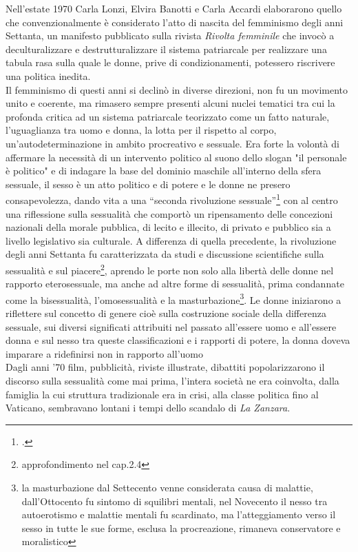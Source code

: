 Nell'estate 1970 Carla Lonzi, Elvira Banotti e Carla Accardi elaborarono quello che convenzionalmente è considerato l'atto di nascita del femminismo degli anni Settanta,  un manifesto pubblicato sulla rivista \textit{Rivolta femminile} che invocò a deculturalizzare e destrutturalizzare il sistema patriarcale per realizzare una tabula rasa sulla quale le donne, prive di condizionamenti, potessero riscrivere una politica inedita.
\\ Il femminismo di questi anni si declinò in diverse direzioni, non fu un movimento unito e coerente, ma rimasero sempre presenti alcuni nuclei tematici tra cui la profonda critica ad un sistema patriarcale teorizzato come un fatto naturale, l'uguaglianza tra uomo e donna, la lotta per il rispetto al corpo, un'autodeterminazione  in ambito procreativo e sessuale.
Era forte la volontà di affermare la necessità di un intervento politico al suono dello slogan "il personale è politico" e di indagare la base del dominio maschile all'interno della sfera sessuale, il sesso è un atto politico e di potere e le donne ne presero consapevolezza, dando vita a una \enquote{seconda rivoluzione sessuale}\footcite{Balestracci} con al centro una riflessione sulla sessualità che comportò un ripensamento delle concezioni nazionali della morale pubblica, di lecito e illecito, di privato e pubblico sia a livello legislativo sia culturale.
A differenza di quella precedente, la rivoluzione degli anni Settanta fu caratterizzata da studi e discussione scientifiche sulla sessualità e sul piacere\footnote{approfondimento nel cap.2.4}, aprendo le porte non solo alla libertà delle donne nel rapporto eterosessuale, ma anche ad altre forme di sessualità, prima condannate come la bisessualità, l'omosessualità e la masturbazione\footnote{la masturbazione dal Settecento venne considerata causa di malattie, dall'Ottocento fu sintomo di squilibri mentali, nel Novecento il nesso tra autoerotismo e malattie mentali fu scardinato, ma l'atteggiamento verso il sesso in tutte le sue forme, esclusa la procreazione, rimaneva conservatore e moralistico}.
Le donne iniziarono a riflettere sul concetto di genere cioè sulla costruzione sociale della differenza sessuale, sui diversi significati attribuiti nel passato all'essere uomo e all'essere donna e sul nesso tra queste classificazioni e i rapporti di potere, la donna doveva imparare a ridefinirsi non in rapporto all'uomo
\\Dagli anni '70 film, pubblicità, riviste illustrate, dibattiti popolarizzarono il discorso sulla sessualità come mai prima, l'intera società ne era coinvolta, dalla famiglia la cui struttura tradizionale era in crisi, alla classe politica fino al Vaticano, sembravano lontani i tempi dello scandalo di \textit{La Zanzara}.
